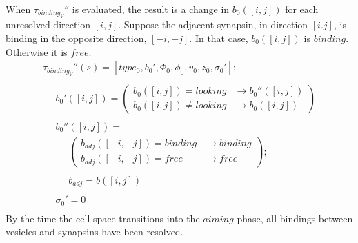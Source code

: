 \documentclass{acm_proc_article-sp}
\begin{document}
When $\tau_{binding_V}''$ is evaluated, the result is a change in 
$b_0([i, j])$ for each unresolved direction $[i, j]$.  Suppose the 
adjacent synapsin, in direction $[i. j]$, is binding in the opposite 
direction, $[-i, -j]$.  In that case, $b_0([i, j])$ is $binding$.
Otherwise it is $free$.
\begin{displaymath} \begin{array}{l}
\tau_{binding_V}''(s) = [type_0, b_0', \Phi_0, \phi_0, v_0, z_0, \sigma_0']; \\
\\
\hspace{16pt} b_0'([i, j]) = \left( \begin{array}{ll} b_0([i, j]) = looking   & \rightarrow b_0''([i, j]) \\
                                                      b_0([i, j]) \ne looking & \rightarrow b_0([i, j]) \end{array} \right) \\
\\
\hspace{16pt} b_0''([i, j]) = \\
\hspace{16pt} \hspace{16pt} \left( \begin{array}{ll} b_{adj}([-i, -j]) = binding & \rightarrow binding \\
                                                     b_{adj}([-i, -j]) = free    & \rightarrow free \end{array} \right); \\
\\
\hspace{16pt} \hspace{16pt} b_{adj} = b([i, j]) \\
\\
\hspace{16pt} \sigma_0' = 0 \\
\end{array} \end{displaymath}
By the time the cell-space transitions into the $aiming$ phase, 
all bindings between vesicles and synapsins have been resolved.
\end{document}
